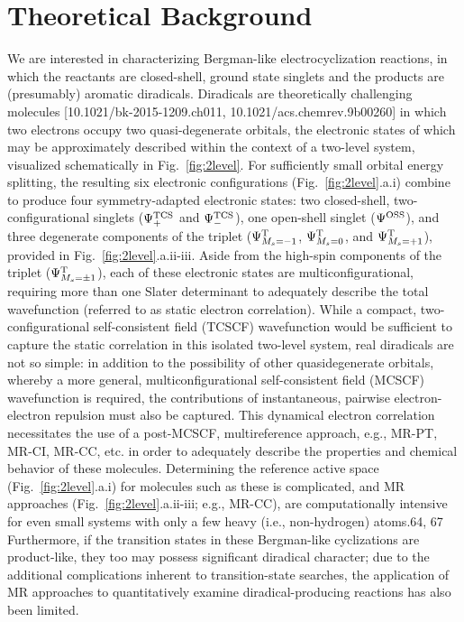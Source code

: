 \documentclass[aip,jcp,preprint,superscriptaddress,floatfix]{revtex4-1}
\begin{document}



\section{Theoretical Background\label{sec:theorybg}}

We are interested in characterizing Bergman-like electrocyclization reactions,
in which the reactants are closed-shell, ground state singlets and the products
are (presumably) aromatic diradicals.  Diradicals are theoretically challenging
molecules [10.1021/bk-2015-1209.ch011, 10.1021/acs.chemrev.9b00260] in which
two electrons occupy two quasi-degenerate orbitals, the electronic states of
which may be approximately described within the context of a two-level system,
visualized schematically in Fig.~\ref{fig:2level}.  For sufficiently small
orbital energy splitting, the resulting six electronic configurations
(Fig.~\ref{fig:2level}.a.i) combine to produce four symmetry-adapted electronic
states: two closed-shell, two-configurational singlets ($\Psi_+^{\rm TCS}$ and
$\Psi_-^{\rm TCS}$), one open-shell singlet ($\Psi^{\rm OSS}$), and three
degenerate components of the triplet ($\Psi_{M_s=-1}^{\rm T}$,
$\Psi_{M_s=0}^{\rm T}$, and $\Psi_{M_s=+1}^{\rm T}$), provided in
Fig.~\ref{fig:2level}.a.ii-iii.  Aside from the high-spin components of the
triplet ($\Psi_{M_s=\pm1}^{\rm T}$), each of these electronic states are
multiconfigurational, requiring more than one Slater determinant to adequately
describe the total wavefunction (referred to as static electron correlation).
While a compact, two-configurational self-consistent field (TCSCF) wavefunction
would be sufficient to capture the static correlation in this isolated
two-level system, real diradicals are not so simple: in addition to the
possibility of other quasidegenerate orbitals, whereby a more general,
multiconfigurational self-consistent field (MCSCF) wavefunction is required,
the contributions of instantaneous, pairwise electron-electron repulsion must
also be captured. This dynamical electron correlation necessitates the use of a
post-MCSCF, multireference approach, e.g., MR-PT, MR-CI, MR-CC, etc. in order
to adequately describe the properties and chemical behavior of these molecules.
Determining the reference active space (Fig.~\ref{fig:2level}.a.i) for
molecules such as these is complicated, and MR approaches
(Fig.~\ref{fig:2level}.a.ii-iii; e.g., MR-CC), are computationally intensive
for even small systems with only a few heavy (i.e., non-hydrogen) atoms.64, 67
Furthermore, if the transition states in these Bergman-like cyclizations are
product-like, they too may possess significant diradical character; due to the
additional complications inherent to transition-state searches, the application
of MR approaches to quantitatively examine diradical-producing reactions has
also been limited.
\end{document}
